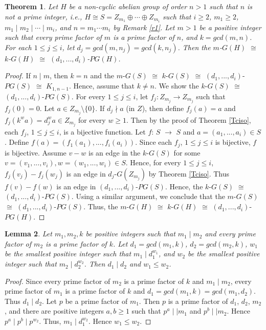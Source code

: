 \documentclass{amsart}
\newtheorem{thm}{Theorem}[section]
\newtheorem{lem}[thm]{Lemma}
\theoremstyle{plain}
\begin{document}
			\begin{thm}\label{TNCiso}
				Let $H$ be a non-cyclic abelian group of order $n >1$ such that $n$ is not a prime integer, i.e., $H \cong S = Z_{m_1} \oplus \cdots \oplus Z_{m_i}$ such that $i \geq 2$, $m_1 \geq 2$, $m_1 \mid m_2 \mid \cdots \mid m_i$, and $n = m_1\cdots m_i$ by Remark \ref{r1}. Let $m > 1$ be a positive integer such that every prime factor of $m$ is a prime factor of $n$, and $k = gcd(m, n)$. For each $1\leq j \leq i$, let $d_j = gcd(m, n_j) = gcd(k, n_j)$. Then the $m$-$G(H)$ $\cong$ $k$-$G(H)$ $\cong$ $(d_1, ... , d_i)$-$PG(H)$.
			\end{thm}
			\begin{proof}
				If $n \mid m$, then $k = n$ and the $m$-$G(S)$ $\cong$ $k$-$G(S)$ $\cong$ $(d_1, ... , d_i)$-$PG(S)$ $\cong$  $K_{1, n-1}$.  Hence, assume that $k \not = n$. We show  the $k$-$G(S)$ $\cong$ $(d_1, ... , d_i)$-$PG(S)$. For every $1 \leq j \leq i$, let $f_j : Z_{m_j} \rightarrow Z_{m_j}$ such that $f_j(0) = 0$. Let $a \in Z_{m_j} \setminus \{0\}$. If $d_j\nmid a$ (in $Z$), then define $f_j(a) = a$ and $f_j(k^wa) = d_j^wa \in Z_{m_j}$ for every $w \geq 1$. Then by the proof of Theorem \ref{Tciso}, each $f_j$, $1 \leq j \leq i$, is a bijective function. Let $f$: $S$  $\rightarrow$ $S$ and $a = (a_1, ... , a_i) \in S$. Define $f(a) = (f_1(a_1), ... , f_i(a_i))$. Since each $f_j$, $1 \leq j \leq i$ is bijective, $f$ is bijective.  Assume $v-w$ is an edge in the $k$-$G(S)$ for some $v = (v_1, ... , v_i), w = (w_1, ... , w_i) \in S$. Hence, for every $1\leq j \leq i$,  $f_j(v_j)-f_j(w_j)$ is an edge in $d_j$-$G(Z_{m_j})$ by Theorem \ref{Tciso}. Thus $f(v)-f(w)$ is an edge in $(d_1, ... , d_i)$-$PG(S)$. Hence, the $k$-$G(S)$ $\cong$ $(d_1, ... , d_i)$-$PG(S)$.  Using a similar argument, we conclude that the $m$-$G(S)$ $\cong$ $(d_1, ... , d_i)$-$PG(S)$. Thus, the $m$-$G(H)$ $\cong$ $k$-$G(H)$ $\cong$ $(d_1, ... , d_i)$-$PG(H)$.
			\end{proof}
			\begin{lem}\label{L3}
			Let $m_1, m_2, k$ be positive integers such that $m_1 \mid m_2$ and every prime factor of $m_2$ is a prime factor of $k$. Let $d_1 = gcd(m_1, k)$, $d_2 = gcd(m_2, k)$, $w_1$ be the smallest positive integer such that $m_1 \mid d_1^{w_1}$, and $w_2$ be the smallest positive integer such that $m_2 \mid d_2^{w_2}$. Then $d_1 \mid d_2$ and $w_1 \leq w_2$.
			\end{lem}
			\begin{proof}
			Since every prime factor of $m_2$ is a prime factor of $k$ and $m_1 \mid m_2$, every prime factor of $m_1$ is a prime factor of $k$ and $d_1 = gcd(m_1, k) = gcd(m_1, d_2)$. Thus $d_1 \mid d_2$. Let $p$ be a prime factor of $m_1$. Then $p$ is a prime factor of $d_1$, $d_2$, $m_2$, and there are positive integers $a, b \geq 1$ such that $p^a \mid\mid m_1$ and $p^b \mid\mid m_2$.  Hence $p^a \mid p^b \mid p^{w_2}$. Thus, $m_1 \mid d_1^{w_2}$.  Hence $w_1 \leq w_2$.
			\end{proof}
\end{document}
